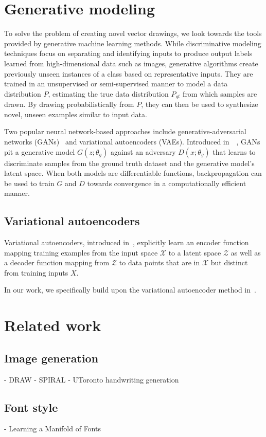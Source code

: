\section{Generative modeling}
To solve the problem of creating novel vector drawings, we look towards the tools provided by generative machine learning methods.
While discriminative modeling techniques focus on separating and identifying inputs to produce output labels learned from high-dimensional data such as images, generative algorithms create previously unseen instances of a class based on representative inputs.
They are trained in an unsupervised or semi-supervised manner to model a data distribution $P$, estimating the true data distribution $P_{gt}$ from which samples are drawn.
By drawing probabilistically from $P$, they can then be used to synthesize novel, unseen examples similar to input data.

Two popular neural network-based approaches include generative-adversarial networks (GANs)~\cite{karpathy2016generative} and variational autoencoders (VAEs).
Introduced in~\citeyear{goodfellow2014generative}~\cite{goodfellow2014generative}, GANs pit a generative model $G(z; \theta_g)$ against an adversary $D(x; \theta_g)$ that learns to discriminate samples from the ground truth dataset and the generative model's latent space.
When both models are differentiable functions, backpropagation can be used to train $G$ and $D$ towards convergence in a computationally efficient manner.

\subsection{Variational autoencoders}
Variational autoencoders, introduced in~\cite{kingma2013auto}, explicitly learn an encoder function mapping training examples from the input space $\mathcal{X}$ to a latent space $\mathcal{Z}$ as well as a decoder function mapping from $\mathcal{Z}$ to data points that are in $\mathcal{X}$ but distinct from training inputs $X$.

In our work, we specifically build upon the variational autoencoder method in~\cite{ha2017neural}.

\section{Related work}
\subsection{Image generation}
- DRAW
- SPIRAL
- UToronto handwriting generation
\subsection{Font style}
- Learning a Manifold of Fonts
